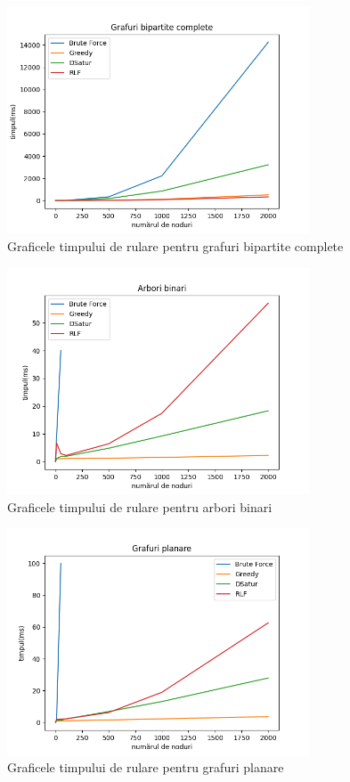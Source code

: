 \documentclass[runningheads]{llncs}
\begin{document}
\begin{figure}[!]
\centering
\includegraphics[width=0.8\textwidth]{./graphics/fig3.png}
\caption{Graficele timpului de rulare pentru grafuri bipartite complete}
\label{fig:bipartite_complete_graphs}
\end{figure}

\begin{figure}[!]
\centering
\includegraphics[width=0.8\textwidth]{./graphics/fig4.png}
\caption{Graficele timpului de rulare pentru arbori binari}
\label{fig:binary_tree_graphs}
\end{figure}

\begin{figure}[!]
\centering
\includegraphics[width=0.8\textwidth]{./graphics/fig5.png}
\caption{Graficele timpului de rulare pentru grafuri planare}
\label{fig:planar_graphs}
\end{figure}
\end{document}
